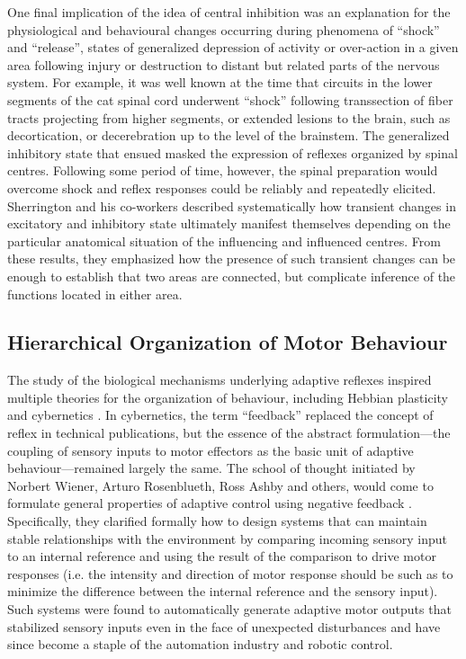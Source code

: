 One final implication of the idea of central inhibition was an explanation for the physiological and behavioural changes occurring during phenomena of ``shock'' and ``release'', states of generalized depression of activity or over-action in a given area following injury or destruction to distant but related parts of the nervous system. For example, it was well known at the time that circuits in the lower segments of the cat spinal cord underwent ``shock'' following transsection of fiber tracts projecting from higher segments, or extended lesions to the brain, such as decortication, or decerebration up to the level of the brainstem. The generalized inhibitory state that ensued masked the expression of reflexes organized by spinal centres. Following some period of time, however, the spinal preparation would overcome shock and reflex responses could be reliably and repeatedly elicited. Sherrington and his co-workers described systematically how transient changes in excitatory and inhibitory state ultimately manifest themselves depending on the particular anatomical situation of the influencing and influenced centres. From these results, they emphasized how the presence of such transient changes can be enough to establish that two areas are connected, but complicate inference of the functions located in either area.

\subsection{Hierarchical Organization of Motor Behaviour}

The study of the biological mechanisms underlying adaptive reflexes inspired multiple theories for the organization of behaviour, including Hebbian plasticity \cite{Hebb1949} and cybernetics \cite{Wiener1948}. In cybernetics, the term ``feedback'' replaced the concept of reflex in technical publications, but the essence of the abstract formulation---the coupling of sensory inputs to motor effectors as the basic unit of adaptive behaviour---remained largely the same. The school of thought initiated by Norbert Wiener, Arturo Rosenblueth, Ross Ashby and others, would come to formulate general properties of adaptive control using negative feedback \cite{Rosenblueth1943,Wiener1948,Ashby1960}. Specifically, they clarified formally how to design systems that can maintain stable relationships with the environment by comparing incoming sensory input to an internal reference and using the result of the comparison to drive motor responses (i.e. the intensity and direction of motor response should be such as to minimize the difference between the internal reference and the sensory input). Such systems were found to automatically generate adaptive motor outputs that stabilized sensory inputs even in the face of unexpected disturbances \cite{Wiener1948,Ashby1960} and have since become a staple of the automation industry and robotic control.

